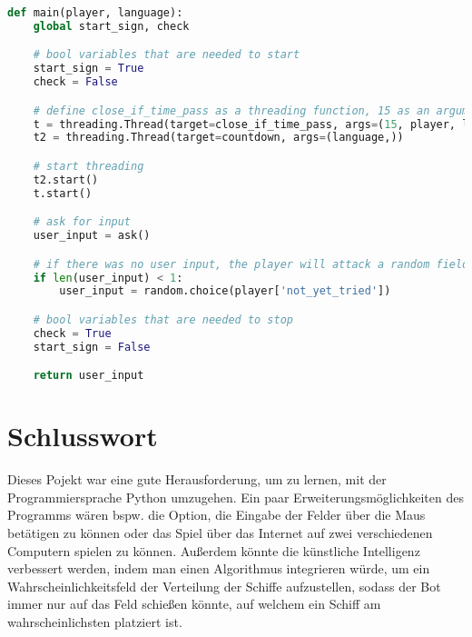 \documentclass{article}
\begin{document}
\begin{lstlisting}[language=Python, caption=main()-Funktion des Countdowns]
def main(player, language):
    global start_sign, check

    # bool variables that are needed to start
    start_sign = True
    check = False

    # define close_if_time_pass as a threading function, 15 as an argument
    t = threading.Thread(target=close_if_time_pass, args=(15, player, language,))
    t2 = threading.Thread(target=countdown, args=(language,))

    # start threading
    t2.start()
    t.start()

    # ask for input
    user_input = ask()

    # if there was no user input, the player will attack a random field automatically
    if len(user_input) < 1:
        user_input = random.choice(player['not_yet_tried'])

    # bool variables that are needed to stop
    check = True
    start_sign = False

    return user_input
\end{lstlisting}

\section{Schlusswort}
    Dieses Pojekt war eine gute Herausforderung, um zu lernen, mit der Programmiersprache Python umzugehen.
    Ein paar Erweiterungsmöglichkeiten des Programms wären bspw. die Option, die Eingabe der Felder über die Maus betätigen zu können oder das Spiel über das Internet auf zwei verschiedenen Computern spielen zu können. Außerdem könnte die künstliche Intelligenz verbessert werden, indem man einen Algorithmus integrieren würde, um ein Wahrscheinlichkeitsfeld der Verteilung der Schiffe aufzustellen, sodass der Bot immer nur auf das Feld schießen könnte, auf welchem ein Schiff am wahrscheinlichsten platziert ist.
\end{document}
